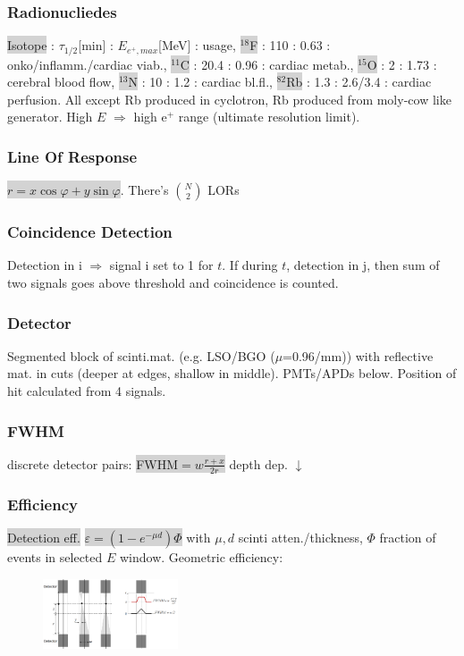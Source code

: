 \documentclass[9pt]{article}
\newcommand{\grey}[1]{\setlength{\fboxsep}{0pt}\colorbox{lightgrey}{#1}}
\begin{document}
\begin{multicols}{2}
\subsubsection{Radionucliedes} \grey{Isotope} : $\tau_{1/2}$[min] : $E_{e^+,max}$[MeV] : usage, \grey{${}^{18}$F} : 110 : 0.63 : onko/inflamm./cardiac viab., \grey{${}^{11}$C} : 20.4 : 0.96 : cardiac metab., \grey{${}^{15}$O} : 2 : 1.73 : cerebral blood flow, \grey{${}^{13}$N} : 10 : 1.2 : cardiac bl.fl., \grey{${}^{82}$Rb} : 1.3 : 2.6/3.4 : cardiac perfusion. All except Rb produced in cyclotron, Rb produced from moly-cow like generator. High $E$ $\Rightarrow$ high e${}^+$ range (ultimate resolution limit).

\subsubsection{Line Of Response}
\grey{$r=x\cos\varphi + y\sin\varphi$}. There's ${N \choose 2}$ LORs
\subsubsection{Coincidence Detection} Detection in i $\Rightarrow$ signal i set to 1 for $t$. If during $t$, detection in j, then sum of two signals goes above threshold and coincidence is counted.

\subsubsection{Detector}
Segmented block of scinti.mat. (e.g. LSO/BGO ($\mu$=0.96/mm)) with reflective mat. in cuts (deeper at edges, shallow in middle). PMTs/APDs below. Position of hit calculated from 4 signals.

\subsubsection{FWHM} discrete detector pairs: \grey{FWHM$=w\frac{r+x}{2r}$} depth dep. $\downarrow$

\subsubsection{Efficiency} 
\grey{Detection eff.} \grey{$\varepsilon = (1-e^{-\mu d})\Phi$} with $\mu,d$ scinti atten./thickness, $\Phi$ fraction of events in selected $E$ window.
Geometric efficiency: 
\begin{figure}
	\vspace{-4mm}
	\includegraphics[width=4cm,]{petfwhm.PNG}
\end{figure}


\end{multicols}
\end{document}
